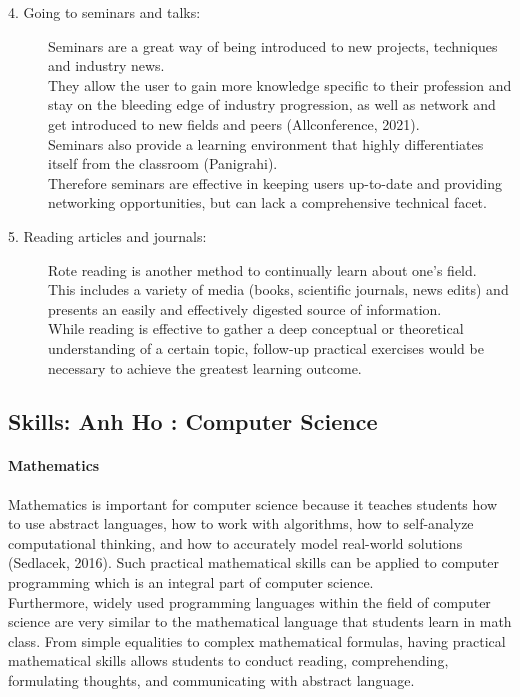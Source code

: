 \documentclass[a4paper, 11pt]{report}
\begin{document}
\begin{description}
		\item [4. Going to seminars and talks:] Seminars are a great way of being introduced to new projects, techniques and industry news.
		\\They allow the user to gain more knowledge specific to their profession and stay on the bleeding edge of industry progression, as well as network and get introduced to new fields and peers (Allconference, 2021).
		\\Seminars also provide a learning environment that highly differentiates itself from the classroom (Panigrahi).
		\\Therefore seminars are effective in keeping users up-to-date and providing networking opportunities, but can lack a comprehensive technical facet.

		\item [5. Reading articles and journals:] Rote reading is another method to continually learn about one's field.
		\\This includes a variety of media (books, scientific journals, news edits) and presents an easily and effectively digested source of information.
		\\While reading is effective to gather a deep conceptual or theoretical understanding of a certain topic, follow-up practical exercises would be necessary to achieve the greatest learning outcome.


	\end{description}


	\subsection{Skills: Anh Ho : Computer Science}
	\paragraph{Mathematics} Mathematics is important for computer science because it teaches students how to use abstract languages, how to work with algorithms, how to self-analyze computational thinking, and how to accurately model real-world solutions (Sedlacek, 2016). Such practical mathematical skills can be applied to computer programming which is an integral part of computer science.
	\\Furthermore, widely used programming languages within the field of computer science are very similar to the mathematical language that students learn in math class. From simple equalities to complex mathematical formulas, having practical mathematical skills allows students to conduct reading, comprehending, formulating thoughts, and communicating with abstract language.
\end{document}
